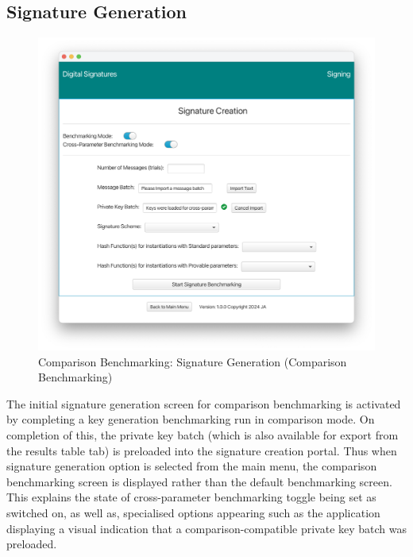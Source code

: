 \documentclass[]{final_report}
\begin{document}
\subsection{Signature Generation}
\begin{figure}[H]
    \centering
    \includegraphics[scale= 0.4]{main_pictures/ui/signing/signing1.png}
   \caption{Comparison Benchmarking: Signature Generation (Comparison Benchmarking)}
\end{figure}
The initial signature generation screen for comparison benchmarking is activated by completing a key generation benchmarking run in comparison mode. On completion of this, the private key batch (which is also available for export from the results table tab) is preloaded into the signature creation portal. Thus when signature generation option is selected from the main menu, the comparison benchmarking screen is displayed rather than the default benchmarking screen.
This explains the state of cross-parameter benchmarking toggle being set as switched on, as well as, specialised options appearing such as the application displaying a visual indication that a comparison-compatible private key batch was preloaded.
\end{document}
